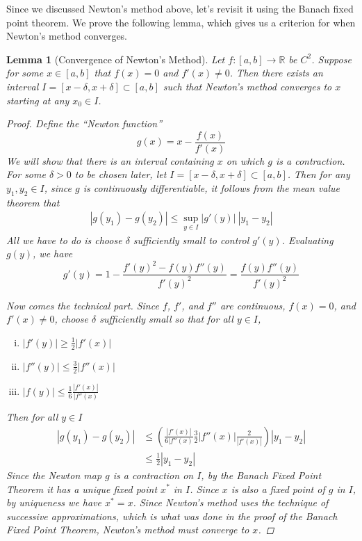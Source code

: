 \documentclass[12pt]{amsart}         %
\newtheorem{lemma}{Lemma}[section]
\theoremstyle{remark}
\newcommand{\R}{\mathbb{R}}
\begin{document}
Since we discussed Newton's method above, let's revisit it using the Banach fixed point theorem. We prove the following lemma, which gives us a criterion for when Newton's method converges.

\begin{lemma}[Convergence of Newton's Method]
Let $f: [a, b] \rightarrow \R$ be $C^2$. Suppose for some $x \in [a, b]$ that $f(x) = 0$ and $f'(x) \neq 0$. Then there exists an interval $I = [x - \delta, x + \delta] \subset [a, b]$ such that Newton's method converges to $x$ starting at any $x_0 \in I$.
\begin{proof}
Define the ``Newton function''
\[
g(x) = x - \frac{f(x)}{f'(x)}
\]
We will show that there is an interval containing $x$ on which $g$ is a contraction. For some $\delta > 0$ to be chosen later, let $I = [x - \delta, x + \delta ] \subset [a, b]$. Then for any $y_1, y_2 \in I$, since $g$ is continuously differentiable, it follows from the mean value theorem that
\begin{align*}
|g(y_1) - g(y_2)| \leq \sup_{y \in I} |g'(y)| \: |y_1 - y_2|
\end{align*}
All we have to do is choose $\delta$ sufficiently small to control $g'(y)$. Evaluating $g(y)$, we have
\[
g'(y) = 1 - \frac{f'(y)^2 - f(y)f''(y)}{f'(y)^2} = \frac{f(y)f''(y)}{f'(y)^2}
\]

Now comes the technical part. Since $f$, $f'$, and $f''$ are continuous, $f(x) = 0$, and $f'(x) \neq 0$, choose $\delta$ sufficiently small so that for all $y \in I$,
\begin{enumerate}[(i)]
	\item $|f'(y)| \geq \frac{1}{2}|f'(x)|$ 
	\item $|f''(y)| \leq \frac{3}{2}|f''(x)|$
	\item $|f(y)| \leq \frac{1}{6} \frac{|f'(x)|}{ |f''(x)}$
\end{enumerate}
Then for all $y \in I$
\begin{align*}
|g(y_1) - g(y_2)| &\leq 
\left( \frac{|f'(x)|}{6 |f''(x)} \frac{3}{2}|f''(x)| \frac{2}{|f'(x)|}\right)|y_1 - y_2| \\ 
&\leq \frac{1}{2}|y_1 - y_2| 
\end{align*}
Since the Newton map $g$ is a contraction on $I$, by the Banach Fixed Point Theorem it has a unique fixed point $x^*$ in $I$. Since $x$ is also a fixed point of $g$ in $I$, by uniqueness we have $x^* = x$. Since Newton's method uses the technique of successive approximations, which is what was done in the proof of the Banach Fixed Point Theorem, Newton's method must converge to $x$.
\end{proof}
\end{lemma}
\end{document}
